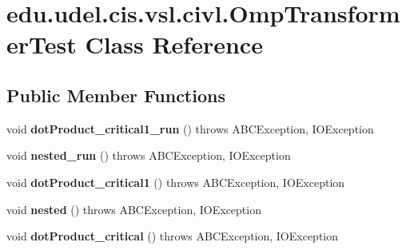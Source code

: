 \hypertarget{classedu_1_1udel_1_1cis_1_1vsl_1_1civl_1_1OmpTransformerTest}{}\section{edu.\+udel.\+cis.\+vsl.\+civl.\+Omp\+Transformer\+Test Class Reference}
\label{classedu_1_1udel_1_1cis_1_1vsl_1_1civl_1_1OmpTransformerTest}
\subsection*{Public Member Functions}
\begin{DoxyCompactItemize}
\item 
\hypertarget{classedu_1_1udel_1_1cis_1_1vsl_1_1civl_1_1OmpTransformerTest_ab8d7891be878114f478e7486bbb2d4d5}{}void {\bfseries dot\+Product\+\_\+critical1\+\_\+run} ()  throws A\+B\+C\+Exception, I\+O\+Exception \label{classedu_1_1udel_1_1cis_1_1vsl_1_1civl_1_1OmpTransformerTest_ab8d7891be878114f478e7486bbb2d4d5}

\item 
\hypertarget{classedu_1_1udel_1_1cis_1_1vsl_1_1civl_1_1OmpTransformerTest_a562e7452685b4a490d9efa9a3848e61f}{}void {\bfseries nested\+\_\+run} ()  throws A\+B\+C\+Exception, I\+O\+Exception \label{classedu_1_1udel_1_1cis_1_1vsl_1_1civl_1_1OmpTransformerTest_a562e7452685b4a490d9efa9a3848e61f}

\item 
\hypertarget{classedu_1_1udel_1_1cis_1_1vsl_1_1civl_1_1OmpTransformerTest_a786976a97d2e08d2e630072d6e56fcd9}{}void {\bfseries dot\+Product\+\_\+critical1} ()  throws A\+B\+C\+Exception, I\+O\+Exception \label{classedu_1_1udel_1_1cis_1_1vsl_1_1civl_1_1OmpTransformerTest_a786976a97d2e08d2e630072d6e56fcd9}

\item 
\hypertarget{classedu_1_1udel_1_1cis_1_1vsl_1_1civl_1_1OmpTransformerTest_a13052d3a7e3b4788b3943e63f5bf9f27}{}void {\bfseries nested} ()  throws A\+B\+C\+Exception, I\+O\+Exception \label{classedu_1_1udel_1_1cis_1_1vsl_1_1civl_1_1OmpTransformerTest_a13052d3a7e3b4788b3943e63f5bf9f27}

\item 
\hypertarget{classedu_1_1udel_1_1cis_1_1vsl_1_1civl_1_1OmpTransformerTest_a8444502bf2ec91b71cb8a8fe299a58a9}{}void {\bfseries dot\+Product\+\_\+critical} ()  throws A\+B\+C\+Exception, I\+O\+Exception \label{classedu_1_1udel_1_1cis_1_1vsl_1_1civl_1_1OmpTransformerTest_a8444502bf2ec91b71cb8a8fe299a58a9}


\end{DoxyCompactItemize}
